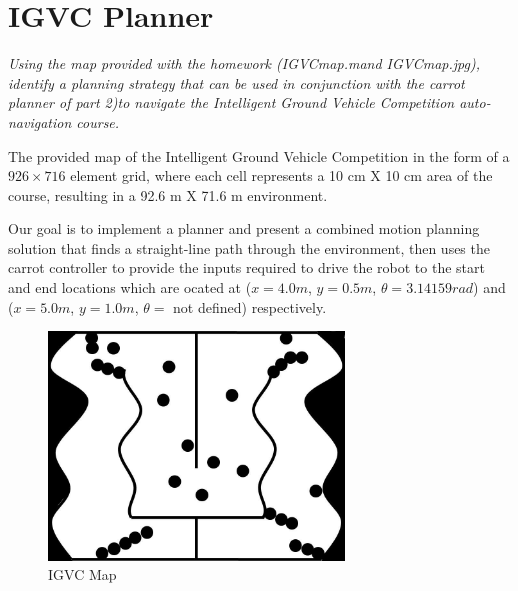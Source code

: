 \documentclass{article}
\begin{document}
\newpage
\section{IGVC Planner}
\label{sec:igvc_planner}
\textit{Using the map provided with the homework (IGVCmap.mand IGVCmap.jpg), identify a planning strategy that can be used in conjunction with the carrot planner of part 2)to navigate the Intelligent Ground Vehicle Competition auto-navigation course.}

The provided map of the Intelligent Ground Vehicle Competition in the form of a $926 \times 716$ element grid, where each cell
represents a 10 cm X 10 cm area of the course, resulting in a 92.6 m X 71.6 m environment. 

Our goal is to implement a planner and present a combined motion planning solution that finds a straight-line path through the environment, then uses the carrot controller to provide the inputs required to drive the robot to the start and end locations which are ocated at ($x = 4.0m$, $y = 0.5m$, $\theta = 3.14159 rad$) and ($x = 5.0 m$, $y = 1.0 m$, $\theta =$ not defined) respectively. 


\begin{figure}[H]
	\centering
	\includegraphics[width=0.7\textwidth]{images/IGVCmap.jpg}
	\caption{IGVC Map}
	\label{fig:igvc_map}
\end{figure}
\end{document}
